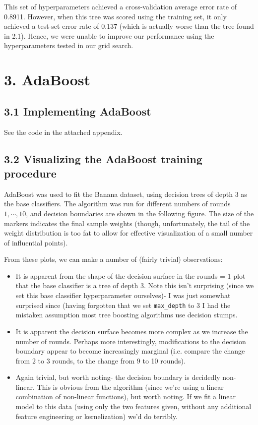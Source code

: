 \documentclass[paper=a4, fontsize=11pt]{scrartcl} %
\numberwithin{equation}{section} %
\numberwithin{figure}{section} %
\numberwithin{table}{section} %
\begin{document}
This set of hyperparameters achieved a cross-validation average error rate of 0.8911. However, when this tree was scored using the training set, it only achieved a test-set error rate of 0.137 (which is actually worse than the tree found in 2.1). Hence, we were unable to improve our performance using the hyperparameters tested in our grid search.


\section*{3. AdaBoost}
\subsection*{3.1 Implementing AdaBoost}

See the code in the attached appendix.

\subsection*{3.2 Visualizing the AdaBoost training procedure}

AdaBoost was used to fit the Banana dataset, using decision trees of depth 3 as the base classifiers. The algorithm was run for different numbers of rounds $1, \cdots, 10$, and decision boundaries are shown in the following figure. The size of the markers indicates the final sample weights (though, unfortunately, the tail of the weight distribution is too fat to allow for effective visualization of a small number of influential points).

From these plots, we can make a number of (fairly trivial) observations:

\begin{itemize}
\item It is apparent from the shape of the decision surface in the rounds = 1 plot that the base classifier is a tree of depth 3. Note this isn't surprising (since we set this base classifier hyperparameter ourselves)- I was just somewhat surprised since (having forgotten that we set \texttt{max\_depth} to 3 I had the mistaken assumption most tree boosting algorithms use decision stumps.
\item It is apparent the decision surface becomes more complex as we increase the number of rounds. Perhaps more interestingly, modifications to the decision boundary appear to become increasingly marginal (i.e. compare the change from 2 to 3 rounds, to the change from 9 to 10 rounds).
\item Again trivial, but worth noting- the decision boundary is decidedly non-linear. This is obvious from the algorithm (since we're using a linear combination of non-linear functions), but worth noting. If we fit a linear model to this data (using only the two features given, without any additional feature engineering or kernelization) we'd do terribly.
\end{itemize}
\end{document}
